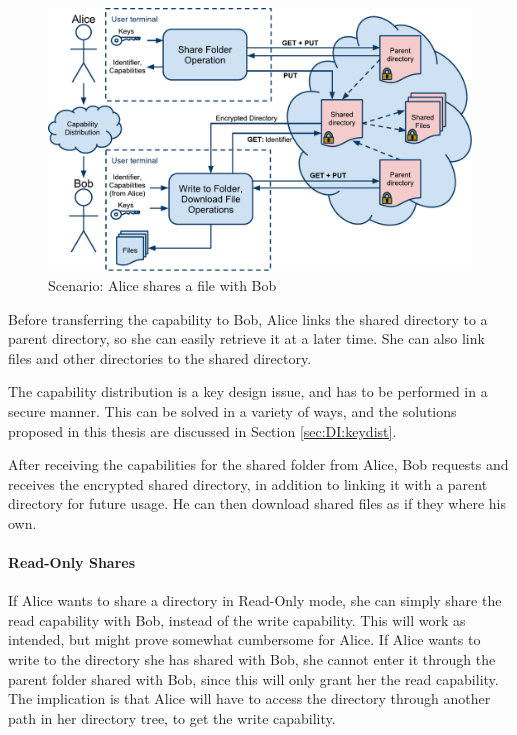 \documentclass[pdftex,english,10pt,b5paper,twoside]{book}
\begin{document}
\begin{figure}[h!]
    \centering
    \includegraphics[width=\columnwidth]{ArchitectureShare.pdf}
    \caption{Scenario: Alice shares a file with Bob}
    \label{fig:AS:sharing}
\end{figure}

Before transferring the capability to Bob, Alice links the shared directory
to a parent directory, so she can easily retrieve it at a later time. She can
also link files and other directories to the shared directory.

The capability distribution is a key design issue, and has to be performed in a
secure manner. This can be solved in a variety of ways, and the solutions
proposed in this thesis are discussed in Section \ref{sec:DI:keydist}.

After receiving the capabilities for the shared folder from Alice, Bob requests
and receives the encrypted shared directory, in addition to linking it with a
parent directory for future usage. He can then download shared files as if they
where his own.

\paragraph{Read-Only Shares}

If Alice wants to share a directory in Read-Only mode, she can simply share the
read capability with Bob, instead of the write capability. This will work as
intended, but might prove somewhat cumbersome for Alice. If Alice wants to
write to the directory she has shared with Bob, she cannot enter it through
the parent folder shared with Bob, since this will only grant her the read
capability. The implication is that Alice will have to access the directory
through another path in her directory tree, to get the write capability.
\end{document}
